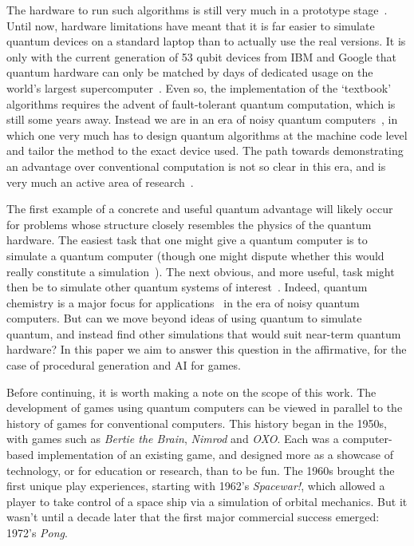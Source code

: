 \documentclass[conference]{IEEEtran}
\begin{document}
The hardware to run such algorithms is still very much in a prototype stage~\cite{quantum-volume}. Until now, hardware limitations have meant that it is far easier to simulate quantum devices on a standard laptop than to actually use the real versions. It is only with the current generation of 53 qubit devices from IBM and Google that quantum hardware can only be matched by days of dedicated usage on the world’s largest supercomputer~\cite{google-supremacy,ibm-summit}. Even so, the implementation of the ‘textbook’ algorithms requires the advent of fault-tolerant quantum computation, which is still some years away. Instead we are in an era of noisy quantum computers~\cite{nisq}, in which one very much has to design quantum algorithms at the machine code level and tailor the method to the exact device used. The path towards demonstrating an advantage over conventional computation is not so clear in this era, and is very much an active area of research~\cite{ibm-nisq}.

The first example of a concrete and useful quantum advantage will likely occur for problems whose structure closely resembles the physics of the quantum hardware. The easiest task that one might give a quantum computer is to simulate a quantum computer (though one might dispute whether this would really constitute a simulation~\cite{horsman:13}). The next obvious, and more useful, task might then be to simulate other quantum systems of interest~\cite{feynman}. Indeed, quantum chemistry is a major focus for applications~\cite{kandala:17,ganzhorn:19} in the era of noisy quantum computers. But can we move beyond ideas of using quantum to simulate quantum, and instead find other simulations that would suit near-term quantum hardware? In this paper we aim to answer this question in the affirmative, for the case of procedural generation and AI for games.

Before continuing, it is worth making a note on the scope of this work. The development of games using quantum computers can be viewed in parallel to the history of games for conventional computers. This history began in the 1950s, with games such as  \textit{Bertie the Brain},  \textit{Nimrod} and  \textit{OXO}. Each was a computer-based implementation of an existing game, and designed more as a showcase of technology, or for education or research, than to be fun. The 1960s brought the first unique play experiences, starting with 1962’s \textit{Spacewar!}, which allowed a player to take control of a space ship via a simulation of orbital mechanics. But it wasn’t until a decade later that the first major commercial success emerged: 1972’s  \textit{Pong}.
\end{document}
